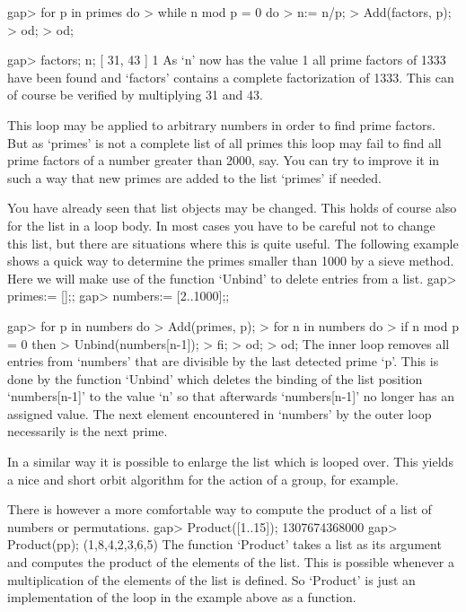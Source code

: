     gap> for p in primes do
    >       while n mod p = 0 do
    >          n:= n/p;
    >          Add(factors, p);
    >       od;
    >    od;

    gap> factors; n;
    [ 31, 43 ]
    1 
\endexample
As `n' now has the value 1 all prime factors  of 1333 have been found and
`factors' contains a complete factorization of  1333.  This can of course
be verified by multiplying 31 and 43.

This loop  may  be applied  to arbitrary  numbers in order  to find prime
factors.  But  as `primes' is not a complete list of all primes this loop
may fail  to find all prime factors of  a number greater than 2000,  say.
You  can try to improve it in such a way that new primes are added to the
list `primes' if needed.

You have already seen that list objects may be  changed.   This holds  of
course also for the  list in a loop body.  In most  cases  you have to be
careful not  to change this list, but there are situations  where this is
quite useful.  The following example  shows a quick way  to determine the
primes smaller than 1000 by a sieve method.  Here we will make use of the
function `Unbind' to delete entries from a list.
\beginexample
    gap> primes:= [];;
    gap> numbers:= [2..1000];;

    gap> for p in numbers do
    >       Add(primes, p);
    >       for n in numbers do
    >          if n mod p = 0 then
    >             Unbind(numbers[n-1]);
    >          fi;
    >       od;
    >    od;
\endexample
The inner loop  removes all entries from `numbers' that are  divisible by
the last detected prime `p'.  This is done by the function `Unbind' which
deletes the binding of the list position  `numbers[n-1]' to the value `n'
so that afterwards `numbers[n-1]' no longer has  an  assigned value.  The
next  element encountered in `numbers'  by the outer  loop necessarily is
the next prime.

In a similar way it is possible to enlarge the list which is looped over.
This yields a nice and short orbit  algorithm for the  action of a group,
for example.


There is however a more comfortable way to  compute the product of a list
of numbers or permutations.
\beginexample
    gap> Product([1..15]);
    1307674368000
    gap> Product(pp);
    (1,8,4,2,3,6,5) 
\endexample
The function  `Product'  takes a  list as  its argument and computes  the
product  of  the  elements  of the  list.   This  is possible whenever  a
multiplication of  the elements of the list is defined.  So  `Product' is
just an implementation of the loop in the example above as a function.

